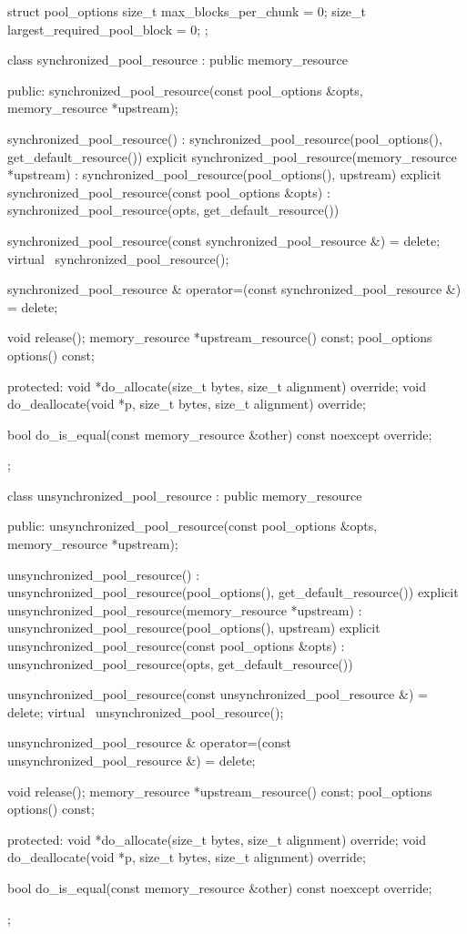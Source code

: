 %
%
%
\begin{codeblock}
struct pool_options {
  size_t max_blocks_per_chunk = 0;
  size_t largest_required_pool_block = 0;
};

class synchronized_pool_resource : public memory_resource {
public:
  synchronized_pool_resource(const pool_options &opts,
                             memory_resource *upstream);

  synchronized_pool_resource()
      : synchronized_pool_resource(pool_options(), get_default_resource()) {}
  explicit synchronized_pool_resource(memory_resource *upstream)
      : synchronized_pool_resource(pool_options(), upstream) {}
  explicit synchronized_pool_resource(const pool_options &opts)
      : synchronized_pool_resource(opts, get_default_resource()) {}

  synchronized_pool_resource(const synchronized_pool_resource &) = delete;
  virtual ~synchronized_pool_resource();

  synchronized_pool_resource &
    operator=(const synchronized_pool_resource &) = delete;

  void release();
  memory_resource *upstream_resource() const;
  pool_options options() const;

protected:
  void *do_allocate(size_t bytes, size_t alignment) override;
  void do_deallocate(void *p, size_t bytes, size_t alignment) override;

  bool do_is_equal(const memory_resource &other) const noexcept override;
};

class unsynchronized_pool_resource : public memory_resource {
public:
  unsynchronized_pool_resource(const pool_options &opts,
                               memory_resource *upstream);

  unsynchronized_pool_resource()
      : unsynchronized_pool_resource(pool_options(), get_default_resource()) {}
  explicit unsynchronized_pool_resource(memory_resource *upstream)
      : unsynchronized_pool_resource(pool_options(), upstream) {}
  explicit unsynchronized_pool_resource(const pool_options &opts)
      : unsynchronized_pool_resource(opts, get_default_resource()) {}

  unsynchronized_pool_resource(const unsynchronized_pool_resource &) = delete;
  virtual ~unsynchronized_pool_resource();

  unsynchronized_pool_resource &
    operator=(const unsynchronized_pool_resource &) = delete;

  void release();
  memory_resource *upstream_resource() const;
  pool_options options() const;

protected:
  void *do_allocate(size_t bytes, size_t alignment) override;
  void do_deallocate(void *p, size_t bytes, size_t alignment) override;

  bool do_is_equal(const memory_resource &other) const noexcept override;
};
\end{codeblock}

